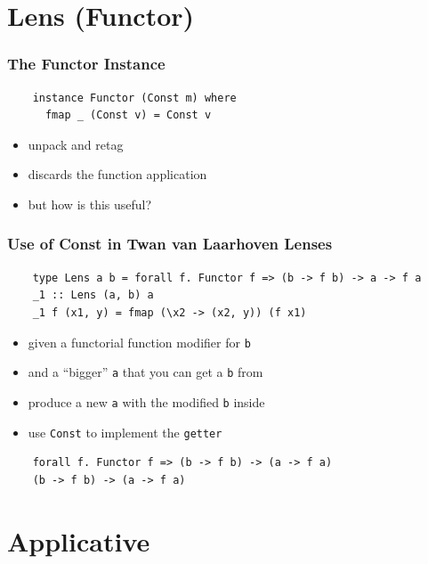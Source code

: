 \documentclass[aspectratio=169]{beamer}
\begin{document}
\section{Lens (Functor)}

\begin{frame}[fragile]
  \frametitle{The Functor Instance}
  \begin{verbatim}
    instance Functor (Const m) where
      fmap _ (Const v) = Const v
  \end{verbatim}
  \vfill
  \begin{itemize}
  \item unpack and retag
  \item discards the function application
  \item but how is this useful?
  \end{itemize}
\end{frame}

\begin{frame}[fragile]
  \frametitle{Use of Const in Twan van Laarhoven Lenses}
  \begin{verbatim}
    type Lens a b = forall f. Functor f => (b -> f b) -> a -> f a
    _1 :: Lens (a, b) a
    _1 f (x1, y) = fmap (\x2 -> (x2, y)) (f x1)
  \end{verbatim}

  \begin{itemize}
  \item given a functorial function modifier for \texttt{b}
  \item and a ``bigger'' \texttt{a} that you can get a \texttt{b} from
  \item produce a new \texttt{a} with the modified \texttt{b} inside
  \end{itemize}
\end{frame}

\begin{frame}[fragile]
  \begin{itemize}
  \item use \texttt{Const} to implement the \texttt{getter}
  \end{itemize}

  \begin{verbatim}
    forall f. Functor f => (b -> f b) -> (a -> f a)
    (b -> f b) -> (a -> f a)
  \end{verbatim}
\end{frame}

\section{Applicative}
\end{document}
